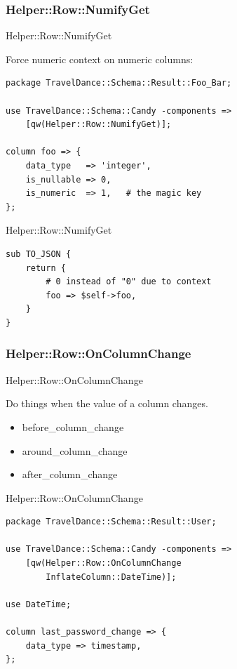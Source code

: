 \subsubsection{Helper::Row::NumifyGet}

\begin{frame}[fragile]{Helper::Row::NumifyGet}

Force numeric context on numeric columns:

\begin{lstlisting}
package TravelDance::Schema::Result::Foo_Bar;

use TravelDance::Schema::Candy -components =>
    [qw(Helper::Row::NumifyGet)];

column foo => {
    data_type   => 'integer',
    is_nullable => 0,
    is_numeric  => 1,   # the magic key
};
\end{lstlisting}
\end{frame}

\begin{frame}[fragile]{Helper::Row::NumifyGet}
\begin{lstlisting}
sub TO_JSON {
    return {
        # 0 instead of "0" due to context
        foo => $self->foo,  
    }
}
\end{lstlisting}
\end{frame}

\subsubsection{Helper::Row::OnColumnChange}

\begin{frame}[fragile]{Helper::Row::OnColumnChange}

Do things when the value of a column changes.

\begin{itemize}
\item before\_column\_change
\item around\_column\_change
\item after\_column\_change
\end{itemize}

\end{frame}

\begin{frame}[fragile]{Helper::Row::OnColumnChange}

\begin{lstlisting}
package TravelDance::Schema::Result::User;

use TravelDance::Schema::Candy -components =>
    [qw(Helper::Row::OnColumnChange 
        InflateColumn::DateTime)];

use DateTime;

column last_password_change => {
    data_type => timestamp,
};
\end{lstlisting}
\end{frame}

